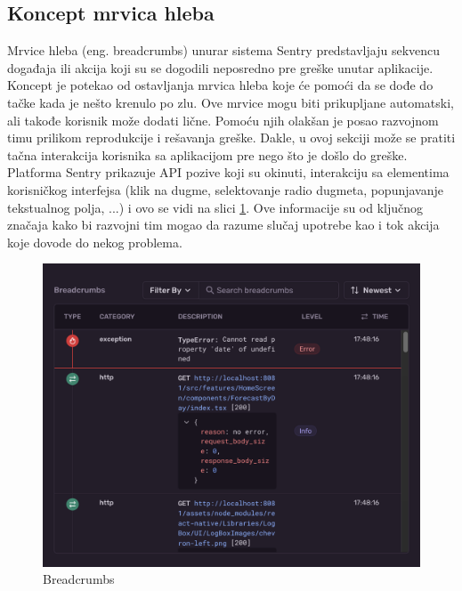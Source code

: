 \documentclass[12pt,oneside]{memoir}
\begin{document}
\subsection{Koncept mrvica hleba}

Mrvice hleba\cite{Breadcrumbs} (eng. breadcrumbs) unurar sistema Sentry predstavljaju sekvencu događaja ili akcija koji su se dogodili neposredno pre greške unutar aplikacije. Koncept je potekao od ostavljanja mrvica hleba koje će pomoći da se dođe do tačke kada je nešto krenulo po zlu. Ove mrvice mogu biti prikupljane automatski, ali takođe korisnik može dodati lične. Pomoću njih olakšan je posao razvojnom timu prilikom reprodukcije i rešavanja greške. Dakle, u ovoj sekciji može se pratiti tačna interakcija korisnika sa aplikacijom pre nego što je došlo do greške. Platforma Sentry prikazuje API pozive koji su okinuti, interakciju sa elementima korisničkog interfejsa (klik na dugme, selektovanje radio dugmeta, popunjavanje tekstualnog polja, ...) i ovo se vidi na slici \ref{fig:sentryBreadcrumbs}. Ove informacije su od ključnog značaja kako bi razvojni tim mogao da razume slučaj upotrebe kao i tok akcija koje dovode do nekog problema. \newline

\newline

\begin{figure}[h!]
\centering
\includegraphics[scale=0.4]{docs/images/chapterSeven/SentryBreadcrumbs.png}
\caption{Breadcrumbs}
\label{fig:sentryBreadcrumbs}
\end{figure}
\end{document}
